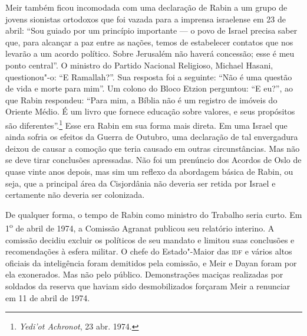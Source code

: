 Meir também ficou incomodada com uma declaração de Rabin a um grupo de
jovens sionistas ortodoxos que foi vazada para a imprensa israelense em
23 de abril: ``Sou guiado por um princípio importante --- o povo de
Israel precisa saber que, para alcançar a paz entre as nações, temos de
estabelecer contatos que nos levarão a um acordo político. Sobre
Jerusalém não haverá concessão; esse é meu ponto central''. O ministro do Partido Nacional Religioso, Michael Hasani, questionou"-o:
``E Ramallah?''. Sua resposta foi a seguinte: ``Não é uma questão de vida e morte para
mim''. Um colono do Bloco Etzion perguntou: ``E eu?'', ao que Rabin
respondeu: ``Para mim, a Bíblia não é um registro de imóveis do Oriente
Médio. É um livro que fornece educação sobre valores, e seus propósitos
são diferentes''.\footnote{\textit{Yedi'ot Achronot}, 23 abr. 1974.} Esse era Rabin em sua forma mais direta. Em
uma Israel que ainda sofria os efeitos da Guerra de Outubro, uma
declaração de tal envergadura deixou de causar a comoção que teria
causado em outras circunstâncias. Mas não se deve tirar conclusões
apressadas. Não foi um prenúncio dos Acordos de Oslo de quase vinte anos
depois, mas sim um reflexo da abordagem básica de Rabin, ou seja, que a
principal área da Cisjordânia não deveria ser retida por Israel e
certamente não deveria ser colonizada.

De qualquer forma, o tempo de Rabin como ministro do Trabalho seria
curto. Em 1\textsuperscript{o} de abril de 1974, a Comissão Agranat
publicou seu relatório interino. A comissão decidiu excluir os políticos
de seu mandato e limitou suas conclusões e recomendações à esfera
militar. O chefe do Estado"-Maior das \textsc{idf} e vários altos oficiais da
inteligência foram demitidos pela comissão, e Meir e Dayan foram por ela
exonerados. Mas não pelo público. Demonstrações maciças realizadas por
soldados da reserva que haviam sido desmobilizados forçaram Meir a
renunciar em 11 de abril de 1974.

